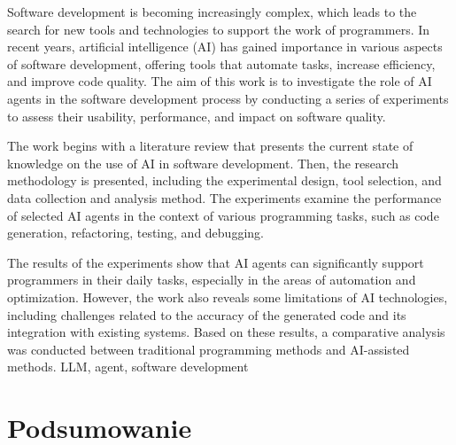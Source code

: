 \documentclass[
    left=2.5cm,         %
    right=2.5cm,        %
    top=2.5cm,          %
    bottom=3cm,         %
    bindingoffset=6mm,  %
    nohyphenation=false %
]{ee/ee-thesis}
\begin{document}
\newpage
\abstract
Software development is becoming increasingly complex, which leads to the search for new tools and technologies to support the work of programmers. In recent years, artificial intelligence (AI) has gained importance in various aspects of software development, offering tools that automate tasks, increase efficiency, and improve code quality. The aim of this work is to investigate the role of AI agents in the software development process by conducting a series of experiments to assess their usability, performance, and impact on software quality.

The work begins with a literature review that presents the current state of knowledge on the use of AI in software development. Then, the research methodology is presented, including the experimental design, tool selection, and data collection and analysis method. The experiments examine the performance of selected AI agents in the context of various programming tasks, such as code generation, refactoring, testing, and debugging.

The results of the experiments show that AI agents can significantly support programmers in their daily tasks, especially in the areas of automation and optimization. However, the work also reveals some limitations of AI technologies, including challenges related to the accuracy of the generated code and its integration with existing systems. Based on these results, a comparative analysis was conducted between traditional programming methods and AI-assisted methods.
\keywords LLM, agent, software development

\cleardoublepage
\pagestyle{plain}
\makeauthorship

\cleardoublepage
\setcounter{tocdepth}{2}
\tableofcontents

\cleardoublepage
\pagestyle{headings}






\section{Podsumowanie}
\end{document}
